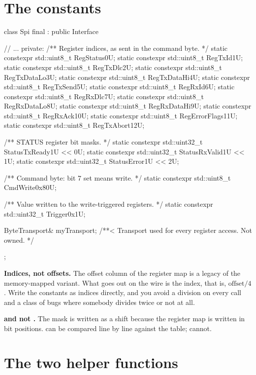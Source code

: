 \section{The constants}
\label{sec:constants}

\begin{cppcode}
class Spi final : public Interface
{
    // ...
private:
    /** Register indices, as sent in the command byte. */
    static constexpr std::uint8_t RegStatus{0U};
    static constexpr std::uint8_t RegTxId{1U};
    static constexpr std::uint8_t RegTxDlc{2U};
    static constexpr std::uint8_t RegTxDataLo{3U};
    static constexpr std::uint8_t RegTxDataHi{4U};
    static constexpr std::uint8_t RegTxSend{5U};
    static constexpr std::uint8_t RegRxId{6U};
    static constexpr std::uint8_t RegRxDlc{7U};
    static constexpr std::uint8_t RegRxDataLo{8U};
    static constexpr std::uint8_t RegRxDataHi{9U};
    static constexpr std::uint8_t RegRxAck{10U};
    static constexpr std::uint8_t RegErrorFlags{11U};
    static constexpr std::uint8_t RegTxAbort{12U};

    /** STATUS register bit masks. */
    static constexpr std::uint32_t StatusTxReady{1U << 0U};
    static constexpr std::uint32_t StatusRxValid{1U << 1U};
    static constexpr std::uint32_t StatusError{1U << 2U};

    /** Command byte: bit 7 set means write. */
    static constexpr std::uint8_t CmdWrite{0x80U};

    /** Value written to the write-triggered registers. */
    static constexpr std::uint32_t Trigger{0x1U};

    ByteTransport& myTransport; /**< Transport used for every register access. Not owned. */
};
\end{cppcode}

\textbf{Indices, not offsets.} The offset column of the register map is a legacy of the
memory-mapped variant. What goes out on the wire is the index, that is, $\text{offset}/4$. Write
the constants as indices directly, and you avoid a division on every call and a class of bugs
where somebody divides twice or not at all.

\textbf{ and not .} The mask is written as a shift because the register
map is written in bit positions.  can be compared line by line
against the table;  cannot.

\section{The two helper functions}
\label{sec:helpers}


